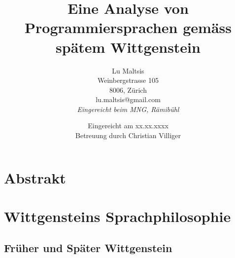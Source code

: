 \documentclass[a4paper,12pt]{article}
\begin{document}
\title{\Large{\textbf{Eine Analyse von Programmiersprachen gemäss spätem Wittgenstein}}}
\author{Lu Maltsis \\
Weinbergstrasse 105 \\
8006, Zürich \\
lu.maltsis@gmail.com \\
\textit{Eingereicht beim MNG, Rämibühl}
}
\date{Eingereicht am xx.xx.xxxx \\
\vspace{10mm}
Betreuung durch Christian Villiger}
\maketitle
\newpage


\section{Abstrakt}
\blindtext[1]


\tableofcontents{}


\section{Wittgensteins Sprachphilosophie}

\subsection{Früher und Später Wittgenstein}
\end{document}
